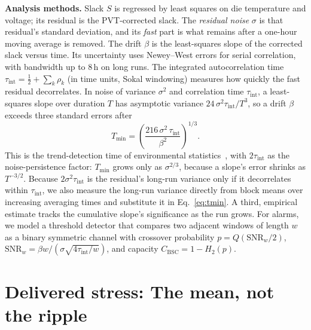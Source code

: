 \documentclass[10pt,twocolumn]{article}
\newcommand{\Tmin}{T_{\min}}
\newcommand{\tint}{\tau_{\mathrm{int}}}
\begin{document}
\textbf{Analysis methods.} Slack $S$ is regressed by least squares on die temperature and voltage; its residual is the PVT-corrected slack. The \emph{residual noise} $\sigma$ is that residual's standard deviation, and its \emph{fast} part is what remains after a one-hour moving average is removed. The drift $\beta$ is the least-squares slope of the corrected slack versus time. Its uncertainty uses Newey--West errors for serial correlation, with bandwidth up to 8\,h on long runs. The integrated autocorrelation time $\tint=\tfrac{1}{2}+\sum_k\rho_k$ (in time units, Sokal windowing) measures how quickly the fast residual decorrelates. In noise of variance $\sigma^2$ and correlation time $\tint$, a least-squares slope over duration $T$ has asymptotic variance $24\,\sigma^2\tint/T^3$, so a drift $\beta$ exceeds three standard errors after
\begin{equation}
\Tmin=\left(\frac{216\,\sigma^2\,\tint}{\beta^2}\right)^{1/3}.
\label{eq:tmin}
\end{equation}
This is the trend-detection time of environmental statistics~\cite{weatherhead}, with $2\tint$ as the noise-persistence factor: $\Tmin$ grows only as $\sigma^{2/3}$, because a slope's error shrinks as $T^{-3/2}$. Because $2\sigma^2\tint$ is the residual's long-run variance only if it decorrelates within $\tint$, we also measure the long-run variance directly from block means over increasing averaging times and substitute it in Eq.~\eqref{eq:tmin}. A third, empirical estimate tracks the cumulative slope's significance as the run grows. For alarms, we model a threshold detector that compares two adjacent windows of length $w$ as a binary symmetric channel with crossover probability $p=Q(\mathrm{SNR}_w/2)$, $\mathrm{SNR}_w=\beta w/(\sigma\sqrt{4\tint/w})$, and capacity $C_{\mathrm{BSC}}=1-H_2(p)$.

\section{Delivered stress: The mean, not the ripple}
\end{document}
